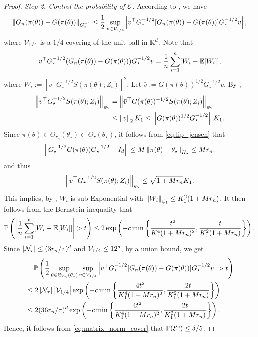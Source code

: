 \begin{proof}
    \emph{Step 2. Control the probability of $\mathcal{E}$.}
    According to \citet[Exercise 4.4.3]{vershynin2018high}, we have
    \begin{align}\label{eq:matrix_norm_cover}
        \left\lVert G_n(\pi(\theta)) - G(\pi(\theta)) \right\rVert_{G_\star^{-1}} \le \frac12 \sup_{v \in \mathcal{V}_{1/4}} \left| v^\top G_\star^{-1/2} [G_n(\pi(\theta)) - G(\pi(\theta))] G_\star^{-1/2} v \right|,
    \end{align}
    where $\mathcal{V}_{1/4}$ is a $1/4$-covering of the unit ball in ${\mathbb R}^d$.
    Note that
    \begin{align*}
        v^\top G_\star^{-1/2} (G_n(\pi(\theta)) - G(\pi(\theta))) G_\star^{-1/2} v = \frac1n \sum_{i=1}^n [W_i - \operatorname{\mathbb E}[W_i]],
    \end{align*}
    where $W_i := [v^\top G_\star^{-1/2} S(\pi(\theta); Z_i)]^2$.
    Let $\bar v := G(\pi(\theta))^{1/2} G_\star^{-1/2} v$.
    By ,
    \begin{align*}
        \left\lVert v^\top G_\star^{-1/2} S(\pi(\theta); Z_i) \right\rVert_{\psi_2}
        &= \left\lVert \bar v^\top G(\pi(\theta))^{-1/2} S(\pi(\theta); Z_i) \right\rVert_{\psi_2} \\
        &\le \left\lVert \bar v \right\rVert_2 K_1 \le \left\lVert G(\pi(\theta))^{1/2} G_\star^{-1/2} \right\rVert K_1.
    \end{align*}
    Since $\pi(\theta) \in \Theta_{r_n}(\theta_\star) \subset \Theta_{r}(\theta_\star)$, it follows from \eqref{eq:lip_jensen} that 
    \begin{align*}
        \left\lVert G_\star^{-1/2} G(\pi(\theta)) G_\star^{-1/2} - I_d \right\rVert \le M \left\lVert \pi(\theta) - \theta_\star \right\rVert_{H_\star} \le M r_n.
    \end{align*}
    and thus
    \begin{align*}
        \left\lVert v^\top G_\star^{-1/2} S(\pi(\theta); Z_i) \right\rVert_{\psi_2} \le \sqrt{1 + Mr_n} K_1.
    \end{align*}
    This implies, by \citet[Lemma 2.7.6]{vershynin2018high}, $W_i$ is sub-Exponential with $\left\lVert W_i \right\rVert_{\psi_1} \le K_1^2 (1 + Mr_n)$.
    It then follows from the Bernstein inequality that
    \begin{align*}
        \operatorname{\mathbb P}\left( \left| \frac1n \sum_{i=1}^n [W_i - \operatorname{\mathbb E}[W_i]] \right| > t \right) \le 2 \exp\left(- c \min\left\{\frac{t^2}{K_1^4 (1 + Mr_n)^2}, \frac{t}{K_1^2 (1 + Mr_n)} \right\} \right).
    \end{align*}
    Since $\left| \mathcal{N}_\tau \right| \le (3r_n/\tau)^d$ and $\mathcal{V}_{1/4} \le 12^d$,
    by a union bound, we get
    \begin{align*}
        &\quad \operatorname{\mathbb P}\left( \frac12 \sup_{\theta \in \Theta_{r_n}(\theta_\star)} \sup_{v \in \mathcal{V}_{1/4}} \left| v^\top G_\star^{-1/2} [G_n(\pi(\theta)) - G(\pi(\theta))] G_\star^{-1/2} v \right| > t \right) \\
        &\le 2 \left| \mathcal{N}_\tau \right| \left| \mathcal{V}_{1/4} \right| \exp\left(- c \min\left\{\frac{4t^2}{K_1^4 (1 + Mr_n)^2}, \frac{2t}{K_1^2 (1 + Mr_n)} \right\} \right) \\
        &\le 2 (36r_n/\tau)^d \exp\left(- c \min\left\{\frac{4t^2}{K_1^4 (1 + Mr_n)^2}, \frac{2t}{K_1^2 (1 + Mr_n)} \right\} \right).
    \end{align*}
    Hence, it follows from \eqref{eq:matrix_norm_cover} that $\operatorname{\mathbb P}(\mathcal{E}^c) \le \delta/5$.
    

\end{proof}
